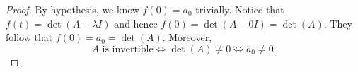 \begin{Exercise}
\begin{proof}
By hypothesis, we know $f(0) = a_0$ trivially. Notice that $f(t) = \det(A-\lambda I)$ and hence $f(0) = \det(A - 0 I) = \det(A)$. They follow that $f(0) = a_0 = \det(A)$. Moreover, 
$$
A\text{ is invertible}
\iff \det(A)\neq 0
\iff a_0\neq 0.
$$
\end{proof}
\end{Exercise}